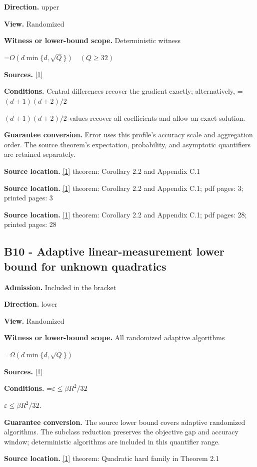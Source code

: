 \documentclass[10pt,a4paper]{article}
\newcommand{\AtlasMath}[1]{\par\begingroup\centering\setbox0=\hbox{$\displaystyle #1$}\ifdim\wd0>1.4\linewidth\typeout{ATLAS WIDE FORMULA: \the\wd0}\fi\ifdim\wd0>\linewidth\resizebox{\linewidth}{!}{\box0}\else\box0\fi\par\endgroup}
\newcommand{\AtlasInlineMath}[1]{\begingroup\setbox0=\hbox{$#1$}\ifdim\wd0>.4\linewidth\endgroup\AtlasMath{#1}\else\endgroup$#1$\fi}
\begin{document}
\textbf{Direction.} upper

\textbf{View.} Randomized

\textbf{Witness or lower-bound scope.} Deterministic witness

\AtlasMath{O(d\min\{d,\sqrt Q\})\quad(Q\ge32)}
\textbf{Sources.} \href{https://arxiv.org/html/2610.00345v1}{[1]}

\textbf{Conditions.} Central differences recover the gradient exactly; alternatively, \AtlasInlineMath{(d+1)(d+2)/2} values recover all coefficients and allow an exact solution.

\textbf{Guarantee conversion.} Error uses this profile's accuracy scale and aggregation order. The source theorem's expectation, probability, and asymptotic quantifiers are retained separately.

\textbf{Source location.} \href{https://arxiv.org/html/2610.00345v1}{[1]} theorem: Corollary 2.2 and Appendix C.1

\textbf{Source location.} \href{https://arxiv.org/html/2610.00345v1}{[1]} theorem: Corollary 2.2 and Appendix C.1; pdf pages: 3; printed pages: 3

\textbf{Source location.} \href{https://arxiv.org/html/2610.00345v1}{[1]} theorem: Corollary 2.2 and Appendix C.1; pdf pages: 28; printed pages: 28

\subsection{B10 - Adaptive linear-measurement lower bound for unknown quadratics}
\textbf{Admission.} Included in the bracket

\textbf{Direction.} lower

\textbf{View.} Randomized

\textbf{Witness or lower-bound scope.} All randomized adaptive algorithms

\AtlasMath{\Omega(d\min\{d,\sqrt Q\})}
\textbf{Sources.} \href{https://arxiv.org/html/2610.00345v1}{[1]}

\textbf{Conditions.} \AtlasInlineMath{\varepsilon\le \beta R^2/32}.

\textbf{Guarantee conversion.} The source lower bound covers adaptive randomized algorithms. The subclass reduction preserves the objective gap and accuracy window; deterministic algorithms are included in this quantifier range.

\textbf{Source location.} \href{https://arxiv.org/html/2610.00345v1}{[1]} theorem: Quadratic hard family in Theorem 2.1
\end{document}
